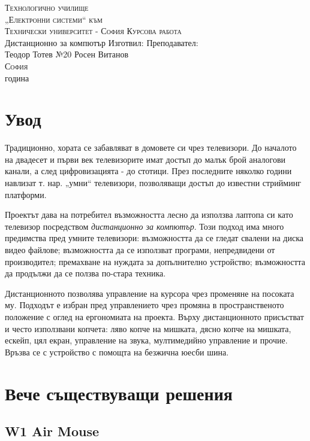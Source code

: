 \documentclass[a4paper,14pt]{extreport}
\begin{document}
\begin{titlepage}
	\centering
	{\scshape\LARGE Технологично училище\\„Електронни системи“ към\\Технически университет - София}
	\vfill
	{\scshape\LARGE Курсова работа} \\
	{\large Дистанционно за компютър}
	\vfill
	{
		Изготвил:        \hfill Преподавател: \\
		Теодор Тотев №20 \hfill Росен Витанов  \\
	}
	{\scshape\large София} \\
	{\large\the\year{} година}
\end{titlepage}

\chapter*{Увод}
Традиционно, хората се забавляват в домовете си чрез телевизори. До началото на двадесет и първи век
телевизорите имат достъп до малък брой аналогови канали, а след цифровизацията - до стотици. През
последните няколко години навлизат т. нар. „умни“ телевизори, позволяващи достъп до известни
стрийминг платформи.

Проектът дава на потребител възможността лесно да използва лаптопа си като телевизор посредством
\textit{дистанционно за компютър}. Този подход има много предимства пред умните телевизори:
възможността да се гледат свалени на диска видео файлове; възможността да се използват програми,
непредвидени от производител; премахване на нуждата за допълнително устройство; възможността да
продължи да се ползва по-стара техника.

Дистанционното позволява управление на курсора чрез променяне на посоката му. Подходът е избран пред
управлението чрез промяна в пространственото положение с оглед на ергономиата на проекта. Върху
дистанционното присъстват и често използвани копчета: ляво копче на мишката, дясно копче на
мишката, ескейп, цял екран, управление на звука, мултимедийно управление и прочие. Връзва се с
устройство с помощта на
безжична юесби шина.

\chapter{Вече съществуващи решения}
\section{W1 Air Mouse}
\end{document}
